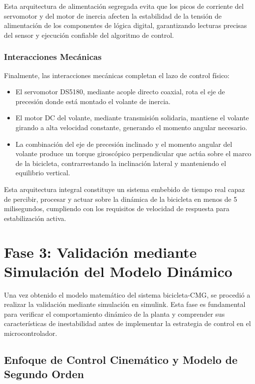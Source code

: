 \documentclass[12pt,letterpaper]{report}
\begin{document}
Esta arquitectura de alimentación segregada evita que los picos de corriente del servomotor y del motor de inercia afecten la estabilidad de la tensión de alimentación de los componentes de lógica digital, garantizando lecturas precisas del sensor y ejecución confiable del algoritmo de control.

\subsubsection*{Interacciones Mecánicas}

Finalmente, las interacciones mecánicas completan el lazo de control físico:

\begin{itemize}
    \setlength\itemsep{4pt}
    \item El servomotor DS5180, mediante acople directo coaxial, rota el eje de precesión donde está montado el volante de inercia.
    
    \item El motor DC del volante, mediante transmisión solidaria, mantiene el volante girando a alta velocidad constante, generando el momento angular necesario.
    
    \item La combinación del eje de precesión inclinado y el momento angular del volante produce un torque giroscópico perpendicular que actúa sobre el marco de la bicicleta, contrarrestando la inclinación lateral y manteniendo el equilibrio vertical.
\end{itemize}

Esta arquitectura integral constituye un sistema embebido de tiempo real capaz de percibir, procesar y actuar sobre la dinámica de la bicicleta en menos de 5 milisegundos, cumpliendo con los requisitos de velocidad de respuesta para estabilización activa.

\section{Fase 3: Validación mediante Simulación del Modelo Dinámico}

Una vez obtenido el modelo matemático del sistema bicicleta-CMG, se procedió a realizar la validación mediante simulación en simulink. Esta fase es fundamental para verificar el comportamiento dinámico de la planta y comprender sus características de inestabilidad antes de implementar la estrategia de control en el microcontrolador.

\subsection*{Enfoque de Control Cinemático y Modelo de Segundo Orden}
\end{document}
